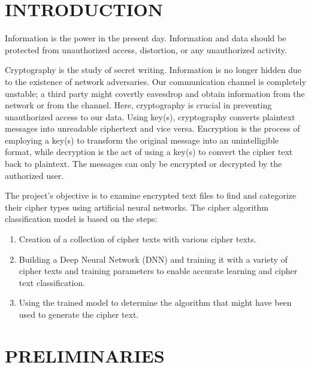 \documentclass[a4paper]{article}
\begin{document}
\setcounter{page}{1}
\newpage
\setcounter{tocdepth}{2} %
\tableofcontents
{}
\newpage

\setcounter{page}{1}

\section{INTRODUCTION}
Information is the power in the present day. 
Information and data should be protected from 
unauthorized access, distortion, or any 
unauthorized activity. 

Cryptography is the study of secret writing. Information is 
no longer hidden due to the existence of network adversaries. 
Our communication channel is completely unstable; a third 
party might covertly eavesdrop and obtain information from 
the network or from the channel. Here, cryptography is crucial 
in preventing unauthorized access to our data. Using key(s), 
cryptography converts plaintext messages into unreadable ciphertext 
and vice versa. Encryption is the process of employing a key(s) 
to transform the original message into an unintelligible format, 
while decryption is the act of using a key(s) to convert the 
cipher text back to plaintext. The messages can only be encrypted 
or decrypted by the authorized user.

The project's objective is to examine encrypted text files to 
find and categorize their cipher types using artificial neural 
networks. The cipher algorithm classification model is based 
on the steps: 
\begin{enumerate}
    \item   Creation of a collection of cipher texts with various cipher texts.
    \item   Building a Deep Neural Network (DNN) and training 
            it with a variety of cipher texts and training parameters 
            to enable accurate learning and cipher text classification. 
    \item   Using the trained model to determine the algorithm 
            that might have been used to generate the cipher text. 
\end{enumerate}

\section{PRELIMINARIES}
\end{document}

